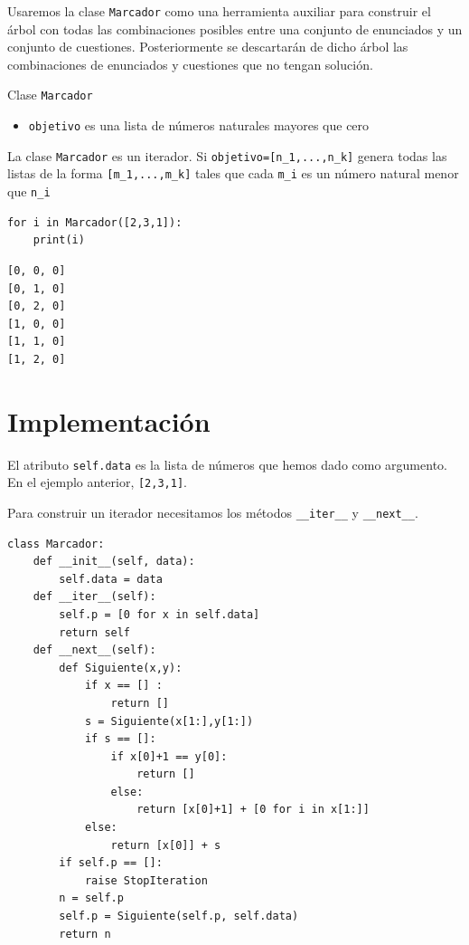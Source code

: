 \documentclass[10pt,a4paper]{report}
\begin{document}
Usaremos la clase \texttt{Marcador} como una herramienta auxiliar para construir el árbol con todas las combinaciones posibles entre una conjunto de enunciados y un conjunto de cuestiones.
Posteriormente se descartarán de dicho árbol las combinaciones de enunciados y cuestiones que no tengan solución.

Clase \texttt{Marcador}
\begin{itemize}
\item \texttt{objetivo} es una lista de números naturales mayores que cero
\end{itemize}

La clase \texttt{Marcador} es un iterador. Si \texttt{objetivo=[n\_1,...,n\_k]} genera todas las listas de la forma \texttt{[m\_1,...,m\_k]} tales que cada \texttt{m\_i} es un número natural menor que \texttt{n\_i}
\begin{verbatim}
for i in Marcador([2,3,1]):
    print(i)
\end{verbatim}

\label{}
\begin{verbatim}
[0, 0, 0]
[0, 1, 0]
[0, 2, 0]
[1, 0, 0]
[1, 1, 0]
[1, 2, 0]
\end{verbatim}
\section{Implementación}
\label{sec:org840823a}

El atributo \texttt{self.data} es la lista de números que hemos dado como argumento. En el ejemplo anterior, \texttt{[2,3,1]}.

Para construir un iterador necesitamos los métodos \texttt{\_\_iter\_\_} y \texttt{\_\_next\_\_}.

\begin{verbatim}
class Marcador:
    def __init__(self, data):
        self.data = data
    def __iter__(self):
        self.p = [0 for x in self.data]
        return self
    def __next__(self):
        def Siguiente(x,y):
            if x == [] :
                return []
            s = Siguiente(x[1:],y[1:])
            if s == []:
                if x[0]+1 == y[0]:
                    return []
                else:
                    return [x[0]+1] + [0 for i in x[1:]]
            else:
                return [x[0]] + s
        if self.p == []:
            raise StopIteration
        n = self.p
        self.p = Siguiente(self.p, self.data)
        return n

\end{verbatim}
\end{document}
